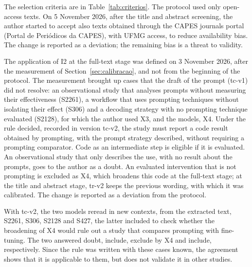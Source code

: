 The selection criteria are in Table~\ref{tab:criterios}. The protocol used only open-access texts. On 5 November 2026, after the title and abstract screening,
the author started to accept also texts obtained through the CAPES journals portal (Portal de Periódicos da CAPES), with UFMG access,
to reduce availability bias. The change is reported as a deviation; the remaining bias is a threat to validity.

The application of I2 at the full-text stage was defined on 3 November 2026, after the measurement of
Section~\ref{sec:calibracao}, and not from the beginning of the protocol. The measurement brought up cases that the draft
of the prompt (tc-v1) did not resolve: an observational study that analyses prompts without measuring their effectiveness
(S2261), a workflow that uses prompting techniques without isolating their effect (S306) and a decoding
strategy with no prompting technique evaluated (S2128), for which the author used X3, and the models, X4.
Under the rule decided, recorded in version tc-v2, the study must report a code result obtained by
prompting, with the prompt strategy described, without requiring a prompting comparator. Code as an
intermediate step is eligible if it is evaluated. An observational study that only describes the use, with no result
about the prompts, goes to the author as a doubt. An evaluated intervention that is not prompting is excluded as X4,
which broadens this code at the full-text stage; at the title and abstract stage, tr-v2 keeps the previous wording, with which
it was calibrated. The change is reported as a deviation from the protocol.

With tc-v2, the two models reread in new contexts, from the extracted text, S2261, S306, S2128 and S427,
the latter included to check whether the broadening of X4 would rule out a study that compares prompting with fine-tuning.
The two answered doubt, include, exclude by X4 and include, respectively. Since the rule was written
with these cases known, the agreement shows that it is applicable to them, but does not validate it in other studies.

